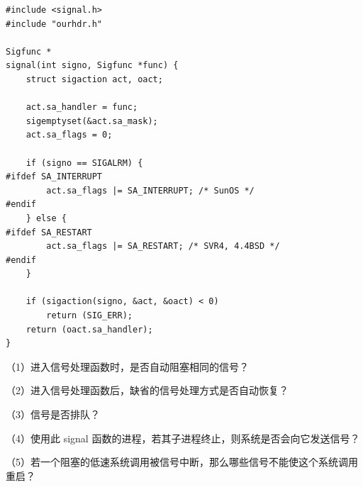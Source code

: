 \documentclass[fontset=exam]{exam-zh}
\begin{document}

\par{}\smallskip

\begin{verbatim}
#include <signal.h>
#include "ourhdr.h"

Sigfunc *
signal(int signo, Sigfunc *func) {
    struct sigaction act, oact;

    act.sa_handler = func;
    sigemptyset(&act.sa_mask);
    act.sa_flags = 0;

    if (signo == SIGALRM) {
#ifdef SA_INTERRUPT
        act.sa_flags |= SA_INTERRUPT; /* SunOS */
#endif
    } else {
#ifdef SA_RESTART
        act.sa_flags |= SA_RESTART; /* SVR4, 4.4BSD */
#endif
    }

    if (sigaction(signo, &act, &oact) < 0)
        return (SIG_ERR);
    return (oact.sa_handler);
}
\end{verbatim}

（1）进入信号处理函数时，是否自动阻塞相同的信号？

（2）进入信号处理函数后，缺省的信号处理方式是否自动恢复？

（3）信号是否排队？

（4）使用此 signal 函数的进程，若其子进程终止，则系统是否会向它发送信号？

（5）若一个阻塞的低速系统调用被信号中断，那么哪些信号不能使这个系统调用重启？


\par{}\smallskip
\end{document}
